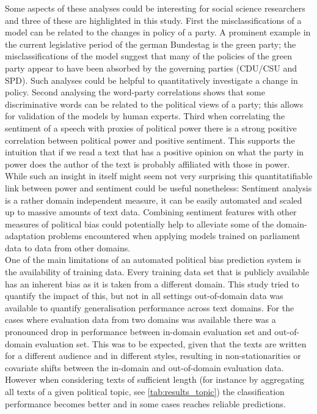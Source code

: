 \documentclass[runningheads,a4paper]{llncs}
\begin{document}
Some aspects of these analyses could be interesting for social science researchers and three of these are highlighted in this study.
First the misclassifications of a model can be related to the changes in policy of a party. A prominent example in the current legislative period of the german Bundestag is the green party; the misclassifications of the model suggest that many of the policies of the green party appear to have been absorbed by the governing parties (CDU/CSU and SPD). Such analyses could be helpful to quantitatively investigate a change in policy. Second analysing the word-party correlations shows that some discriminative words can be related to the political views of a party; this allows for validation of the models by human experts. Third when correlating the sentiment of a speech with proxies of political power there is a strong positive correlation between political power and positive sentiment. This supports the intuition that if we read a text that has a positive opinion on what the party in power does the author of the text is probably affiliated with those in power. While such an insight in itself might seem not very surprising this quantitatifiable link between power and sentiment could be useful nonetheless: Sentiment analysis is a rather domain independent measure, it can be easily automated and scaled up to massive amounts of text data. Combining sentiment features with other measures of political bias could potentially help to alleviate some of the domain-adaptation problems encountered when applying models trained on parliament data to data from other domains. \\

One of the main limitations of an automated political bias prediction system is the availability of training data. Every training data set that is publicly available has an inherent bias as it is taken from a different domain. This study tried to quantify the impact of this, but not in all settings out-of-domain data was available to quantify generalisation performance across text domains. 
For the cases where evaluation data from two domains was available there was a pronounced drop in performance between in-domain evaluation set and out-of-domain evaluation set. This was to be expected, given that the texts are written for a different audience and in different styles, resulting in non-stationarities or covariate shifts between the in-domain and out-of-domain evaluation data. However when considering texts of sufficient length (for instance by aggregating all texts of a given political topic, see \autoref{tab:results_topic}) the classification performance becomes better and in some cases reaches reliable predictions.\\
\end{document}

